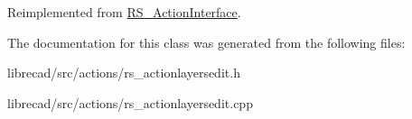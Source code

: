 Reimplemented from \hyperlink{classRS__ActionInterface_aa2ba8f6f697f735eace4ec5449c0b8cd}{R\-S\-\_\-\-Action\-Interface}.



The documentation for this class was generated from the following files\-:\begin{DoxyCompactItemize}
\item 
librecad/src/actions/rs\-\_\-actionlayersedit.\-h\item 
librecad/src/actions/rs\-\_\-actionlayersedit.\-cpp\end{DoxyCompactItemize}
